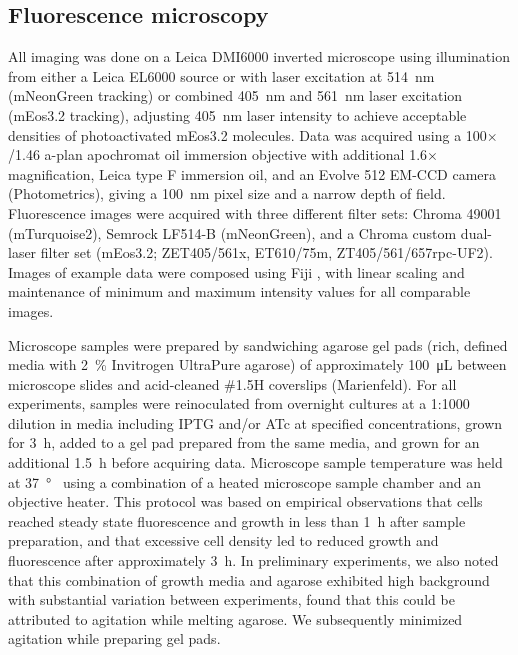 \documentclass[twocolumn,pdflatex,sn-nature]{sn-jnl}%
\begin{document}
\subsection{Fluorescence microscopy}

All imaging was done on a Leica DMI6000 inverted microscope using illumination from either a Leica EL6000 source or with laser excitation at \qty{514}{\nm} (mNeonGreen tracking) or combined \qty{405}{\nm} and \qty{561}{\nm} laser excitation (mEos3.2 tracking), adjusting \qty{405}{\nm} laser intensity to achieve acceptable densities of photoactivated mEos3.2 molecules.
Data was acquired using a 100$\times$/1.46 a-plan apochromat oil immersion objective with additional 1.6$\times$ magnification, Leica type F immersion oil, and an Evolve 512 EM-CCD camera (Photometrics), giving a \qty{100}{\nm} pixel size and a narrow depth of field.
Fluorescence images were acquired with three different filter sets: Chroma 49001 (mTurquoise2), Semrock LF514-B (mNeonGreen), and a Chroma custom dual-laser filter set (mEos3.2; ZET405/561x, ET610/75m, ZT405/561/657rpc-UF2).
Images of example data were composed using Fiji \citep{schindelinFijiOpensourcePlatform2012}, with linear scaling and maintenance of minimum and maximum intensity values for all comparable images.

Microscope samples were prepared by sandwiching agarose gel pads (rich, defined media with \qty{2}{\percent} Invitrogen UltraPure agarose) of approximately \qty{100}{\uL} between microscope slides and acid-cleaned \#1.5H coverslips (Marienfeld).
For all experiments, samples were reinoculated from overnight cultures at a 1:1000 dilution in media including IPTG and/or ATc at specified concentrations, grown for \qty{3}{\hour}, added to a gel pad prepared from the same media, and grown for an additional \qty{1.5}{\hour} before acquiring data.
Microscope sample temperature was held at \qty{37}{\degree\C} using a combination of a heated microscope sample chamber and an objective heater.
This protocol was based on empirical observations that cells reached steady state fluorescence and growth in less than \qty{1}{\hour} after sample preparation, and that excessive cell density led to reduced growth and fluorescence after approximately \qty{3}{\hour}.
In preliminary experiments, we also noted that this combination of growth media and agarose exhibited high background with substantial variation between experiments, found that this could be attributed to agitation while melting agarose.
We subsequently minimized agitation while preparing gel pads.
\end{document}
